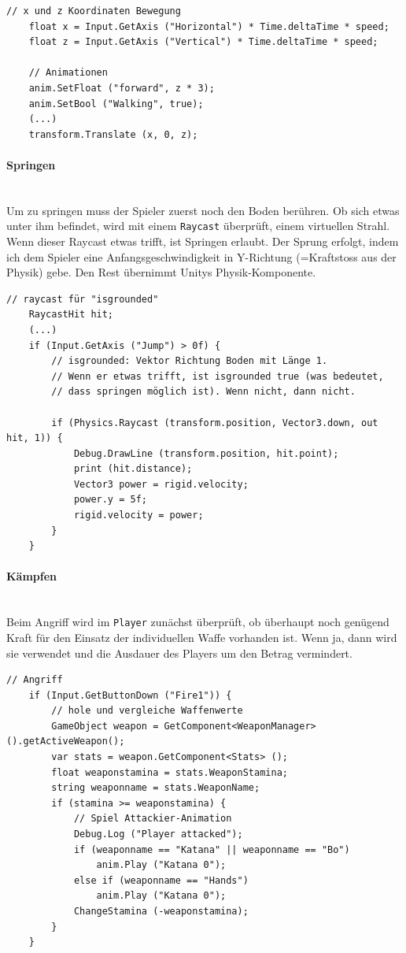 \begin{lstlisting}[caption={Laufen}]
	// x und z Koordinaten Bewegung
	float x = Input.GetAxis ("Horizontal") * Time.deltaTime * speed;
	float z = Input.GetAxis ("Vertical") * Time.deltaTime * speed;
        
	// Animationen
	anim.SetFloat ("forward", z * 3);
	anim.SetBool ("Walking", true);
	(...)
	transform.Translate (x, 0, z);
\end{lstlisting}

\paragraph{Springen}\mbox{} \\
Um zu springen muss der Spieler zuerst noch den Boden berühren.
Ob sich etwas unter ihm befindet, wird mit einem \lstinline{Raycast} überprüft, einem virtuellen Strahl.
Wenn dieser Raycast etwas trifft, ist Springen erlaubt.
Der Sprung erfolgt, indem ich dem Spieler eine Anfangsgeschwindigkeit in Y-Richtung (=Kraftstoss aus der Physik) gebe. Den Rest übernimmt Unitys Physik-Komponente.

\begin{lstlisting}[caption={Springen}]
	// raycast für "isgrounded"
	RaycastHit hit;
	(...)
	if (Input.GetAxis ("Jump") > 0f) {
		// isgrounded: Vektor Richtung Boden mit Länge 1. 
		// Wenn er etwas trifft, ist isgrounded true (was bedeutet,
		// dass springen möglich ist). Wenn nicht, dann nicht. 

		if (Physics.Raycast (transform.position, Vector3.down, out hit, 1)) {
			Debug.DrawLine (transform.position, hit.point);
			print (hit.distance);
			Vector3 power = rigid.velocity;
			power.y = 5f;
			rigid.velocity = power;
		}
	}
\end{lstlisting}

\paragraph{Kämpfen}\mbox{} \\
Beim Angriff wird im \lstinline{Player} zunächst überprüft, ob überhaupt noch genügend Kraft für den Einsatz der individuellen Waffe vorhanden ist. Wenn ja, dann wird sie verwendet und die Ausdauer des Players um den Betrag vermindert.

\begin{lstlisting}[caption={Angriff}]
	// Angriff
	if (Input.GetButtonDown ("Fire1")) {	
		// hole und vergleiche Waffenwerte
		GameObject weapon = GetComponent<WeaponManager> ().getActiveWeapon();
		var stats = weapon.GetComponent<Stats> ();
		float weaponstamina = stats.WeaponStamina;
		string weaponname = stats.WeaponName;
		if (stamina >= weaponstamina) {
			// Spiel Attackier-Animation
			Debug.Log ("Player attacked");
			if (weaponname == "Katana" || weaponname == "Bo")
				anim.Play ("Katana 0");
			else if (weaponname == "Hands")
				anim.Play ("Katana 0"); 
			ChangeStamina (-weaponstamina);
		}
	}
\end{lstlisting}
		
